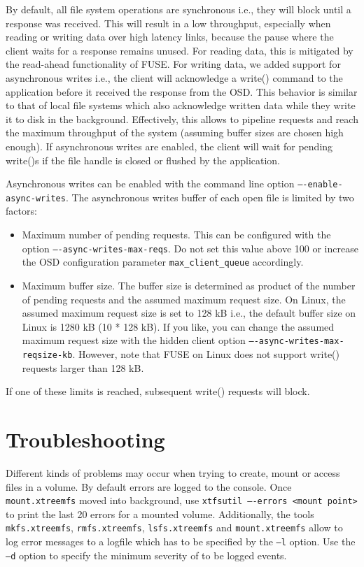 \documentclass[a4paper,10pt]{book}
\begin{document}
By default, all file system operations are synchronous i.e., they will block until a response was received. This will result in a low throughput, especially when reading or writing data over high latency links, because the pause where the client waits for a response remains unused. For reading data, this is mitigated by the read-ahead functionality of FUSE. For writing data, we added support for asynchronous writes i.e., the client will acknowledge a write() command to the application before it received the response from the OSD. This behavior is similar to that of local file systems which also acknowledge written data while they write it to disk in the background. Effectively, this allows to pipeline requests and reach the maximum throughput of the system (assuming buffer sizes are chosen high enough). If asynchronous writes are enabled, the client will wait for pending write()s if the file handle is closed or flushed by the application.

Asynchronous writes can be enabled with the command line option \texttt{----enable-async-writes}. The asynchronous writes buffer of each open file is limited by two factors:
\begin{itemize}
 \item Maximum number of pending requests. This can be configured with the option \texttt{----async-writes-max-reqs}. Do not set this value above 100 or increase the OSD configuration parameter \texttt{max\_client\_queue} accordingly.
 \item Maximum buffer size. The buffer size is determined as product of the number of pending requests and the assumed maximum request size. On Linux, the assumed maximum request size is set to 128 kB i.e., the default buffer size on Linux is 1280 kB (10 * 128 kB). If you like, you can change the assumed maximum request size with the hidden client option \texttt{----async-writes-max-reqsize-kb}. However, note that FUSE on Linux does not support write() requests larger than 128 kB.
\end{itemize}
If one of these limits is reached, subsequent write() requests will block.

\section{Troubleshooting}

Different kinds of problems may occur when trying to create, mount or access files in a volume. By default errors are logged to the console. Once \texttt{mount.xtreemfs} moved into background, use \texttt{xtfsutil ----errors <mount point>} to print the last 20 errors for a mounted volume. Additionally, the tools \texttt{mkfs.xtreemfs}, \texttt{rmfs.xtreemfs}, \texttt{lsfs.xtreemfs} and \texttt{mount.xtreemfs} allow to log error messages to a logfile which has to be specified by the \texttt{--l} option. Use the \texttt{--d} option to specify the minimum severity of to be logged events.
\end{document}
